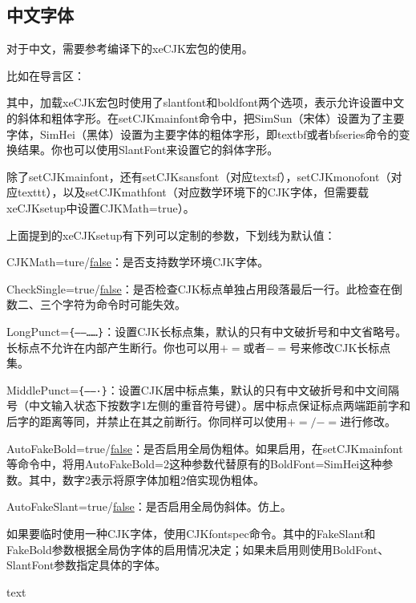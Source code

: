{\subsection{中文字体}
对于中文，需要参考\xelatex 编译下的xeCJK宏包的使用。

比如在导言区：
\begin{latex}{}
\usepackage[slantfont,boldfont]{xeCJK}
\end{latex}

其中，加载xeCJK宏包时使用了slantfont和boldfont两个选项，表示允许设置中文的斜体和粗体字形。在setCJKmainfont命令中，把SimSun（宋体）设置为了主要字体，SimHei（黑体）设置为主要字体的粗体字形，即textbf或者bfseries命令的变换结果。你也可以使用SlantFont来设置它的斜体字形。

除了setCJKmainfont，还有setCJKsansfont（对应textsf），setCJKmonofont（对应texttt），以及setCJKmathfont（对应数学环境下的CJK字体，但需要载xeCJKsetup中设置CJKMath=true）。

上面提到的xeCJKsetup有下列可以定制的参数，下划线为默认值：
\begin{feai}
\item CJKMath=ture/\uline{false}：是否支持数学环境CJK字体。
\item CheckSingle=true/\uline{false}：是否检查CJK标点单独占用段落最后一行。此检查在倒数二、三个字符为命令时可能失效。
\item LongPunct=\verb|{——……}|：设置CJK长标点集，默认的只有中文破折号和中文省略号。长标点不允许在内部产生断行。你也可以用$+=$或者$-=$号来修改CJK长标点集。
\item MiddlePunct=\verb|{——·}|：设置CJK居中标点集，默认的只有中文破折号和中文间隔号（中文输入状态下按数字1左侧的重音符号键）。居中标点保证标点两端距前字和后字的距离等同，并禁止在其之前断行。你同样可以使用$+=/-=$进行修改。
\item AutoFakeBold=true/\uline{false}：是否启用全局伪粗体。如果启用，在setCJKmainfont等命令中，将用AutoFakeBold=2这种参数代替原有的BoldFont=SimHei这种参数。其中，数字2表示将原字体加粗2倍实现伪粗体。
\item AutoFakeSlant=true/\uline{false}：是否启用全局伪斜体。仿上。
\end{feai}

如果要临时使用一种CJK字体，使用CJKfontspec命令。其中的FakeSlant和FakeBold参数根据全局伪字体的启用情况决定；如果未启用则使用BoldFont、SlantFont参数指定具体的字体。
\begin{latex}{}
{ text}
\end{latex}

}

